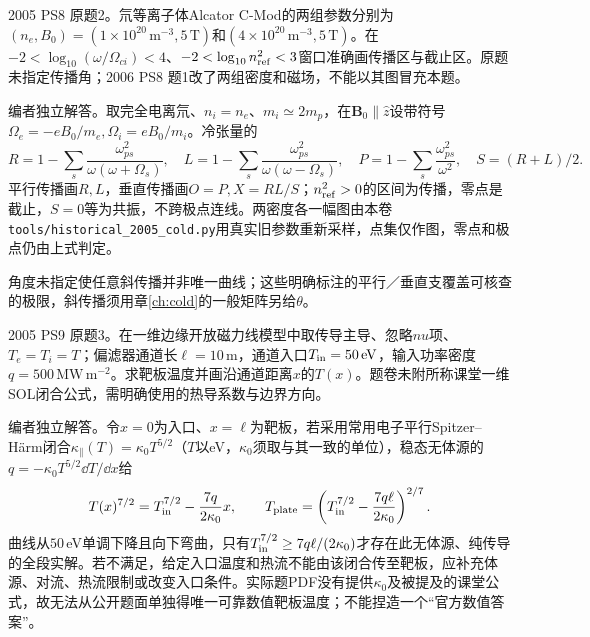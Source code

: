\begin{exercise}\label{ex:hist05-8-2}
2005 PS8 原题2。氘等离子体Alcator C-Mod的两组参数分别为$(n_e,B_0)=(1\times10^{20}\,\mathrm m^{-3},5\,\mathrm T)$和$(4\times10^{20}\,\mathrm m^{-3},5\,\mathrm T)$。在$-2<\log_{10}(\omega/\Omega_{ci})<4$、$-2<\log_{10}n_{\rm ref}^2<3$窗口准确画传播区与截止区。原题未指定传播角；2006 PS8 题1改了两组密度和磁场，不能以其图冒充本题。
\end{exercise}
\begin{solution}
编者独立解答。取完全电离氘、$n_i=n_e$、$m_i\simeq2m_p$，在$\mathbf B_0\parallel\hat z$设带符号$\Omega_e=-eB_0/m_e,\Omega_i=eB_0/m_i$。冷张量的
\begin{equation}
R=1-\sum_s\frac{\omega_{ps}^2}{\omega(\omega+\Omega_s)},\quad
L=1-\sum_s\frac{\omega_{ps}^2}{\omega(\omega-\Omega_s)},\quad
P=1-\sum_s\frac{\omega_{ps}^2}{\omega^2},\quad S=(R+L)/2.
\end{equation}
平行传播画$R,L$，垂直传播画$O=P,X=RL/S$；$n_{\rm ref}^2>0$的区间为传播，零点是截止，$S=0$等为共振，不跨极点连线。两密度各一幅图由本卷\texttt{tools/historical\_2005\_cold.py}用真实旧参数重新采样，点集仅作图，零点和极点仍由上式判定。

角度未指定使任意斜传播并非唯一曲线；这些明确标注的平行／垂直支覆盖可核查的极限，斜传播须用章\ref{ch:cold}的一般矩阵另给$\theta$。
\end{solution}

\begin{exercise}\label{ex:hist05-9-3}
2005 PS9 原题3。在一维边缘开放磁力线模型中取传导主导、忽略$nu$项、$T_e=T_i=T$；偏滤器通道长$\ell=10\,\mathrm m$，通道入口$T_{\rm in}=50\,\mathrm{eV}$，输入功率密度$q=500\,\mathrm{MW\,m^{-2}}$。求靶板温度并画沿通道距离$x$的$T(x)$。题卷未附所称课堂一维SOL闭合公式，需明确使用的热导系数与边界方向。
\end{exercise}
\begin{solution}
编者独立解答。令$x=0$为入口、$x=\ell$为靶板，若采用常用电子平行Spitzer--H\"arm闭合$\kappa_\parallel(T)=\kappa_0T^{5/2}$（$T$以eV，$\kappa_0$须取与其一致的单位），稳态无体源的$q=-\kappa_0T^{5/2}\dd T/\dd x$给
\begin{equation}
T(x)^{7/2}=T_{\rm in}^{7/2}-\frac{7q}{2\kappa_0}x,\qquad
T_{\rm plate}=\left(T_{\rm in}^{7/2}-\frac{7q\ell}{2\kappa_0}\right)^{2/7}.
\end{equation}
曲线从$50\,$eV单调下降且向下弯曲，只有$T_{\rm in}^{7/2}\ge 7q\ell/(2\kappa_0)$才存在此无体源、纯传导的全段实解。若不满足，给定入口温度和热流不能由该闭合传至靶板，应补充体源、对流、热流限制或改变入口条件。实际题PDF没有提供$\kappa_0$及被提及的课堂公式，故无法从公开题面单独得唯一可靠数值靶板温度；不能捏造一个“官方数值答案”。
\end{solution}

